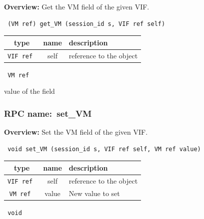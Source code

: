 {\bf Overview:} 
Get the VM field of the given VIF.

\begin{verbatim} (VM ref) get_VM (session_id s, VIF ref self)\end{verbatim}



 
\vspace{0.3cm}
\begin{tabular}{|c|c|p{7cm}|}
 \hline
{\bf type} & {\bf name} & {\bf description} \\ \hline
{\tt VIF ref } & self & reference to the object \\ \hline 

\end{tabular}

\vspace{0.3cm}

{\tt 
VM ref
}


value of the field
\vspace{0.3cm}
\vspace{0.3cm}
\vspace{0.3cm}
\subsubsection{RPC name:~set\_VM}

{\bf Overview:} 
Set the VM field of the given VIF.

\begin{verbatim} void set_VM (session_id s, VIF ref self, VM ref value)\end{verbatim}



 
\vspace{0.3cm}
\begin{tabular}{|c|c|p{7cm}|}
 \hline
{\bf type} & {\bf name} & {\bf description} \\ \hline
{\tt VIF ref } & self & reference to the object \\ \hline 

{\tt VM ref } & value & New value to set \\ \hline 

\end{tabular}

\vspace{0.3cm}

{\tt 
void
}



